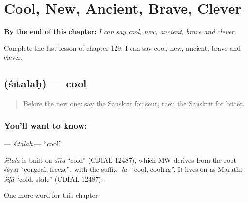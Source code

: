 
\chapter{Cool, New, Ancient, Brave, Clever}
\label{ch:sa-cool-new-ancient-brave-clever}

\begin{chapteropening}
\textbf{By the end of this chapter:} \emph{I can say cool, new, ancient, brave and clever.}

Complete the last lesson of chapter 129: I can say cool, new, ancient, brave and clever.
\end{chapteropening}

\section[\texorpdfstring{\sk{शीतलः} (śītalaḥ)}{शीतलः (śītalaḥ)}]{ (śītalaḥ) — cool}

\label{lesson:SA-C129-sitalah}



\begin{quote}
Before the new one: say the Sanskrit for sour, then the Sanskrit for bitter.
\end{quote}

\subsection*{You'll want to know: }
\textbf{} — \emph{śītalaḥ} — \textquotedblleft{}cool\textquotedblright{}.

\begin{cousinweb}
\emph{śītala} is built on \emph{śīta} \textquotedblleft{}cold\textquotedblright{} (CDIAL 12487), which MW derives from the root √śyai \textquotedblleft{}congeal, freeze\textquotedblright{}, with the suffix \emph{-la}: \textquotedblleft{}cool, cooling\textquotedblright{}. It lives on as Marathi \emph{śiḷā} \textquotedblleft{}cold, stale\textquotedblright{} (CDIAL 12487).
\end{cousinweb}

\begin{grammarlens}[title={What you've built}]
One more word for this chapter.
\end{grammarlens}

